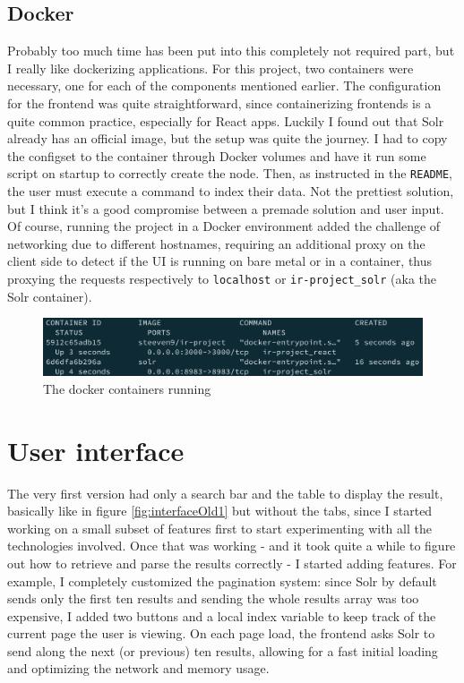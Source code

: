 \documentclass[12pt]{article}
\begin{document}
	\newpage
	
	\subsection{Docker}
	
		Probably too much time has been put into this completely not required part, but I really like dockerizing applications. For this project, two containers were necessary, one for each of the components mentioned earlier. The configuration for the frontend was quite straightforward, since containerizing frontends is a quite common practice, especially for React apps. Luckily I found out that Solr already has an official image, but the setup was quite the journey. I had to copy the configset to the container through Docker volumes and have it run some script on startup to correctly create the node. Then, as instructed in the \texttt{README}, the user must execute a command to index their data. Not the prettiest solution, but I think it's a good compromise between a premade solution and user input. Of course, running the project in a Docker environment added the challenge of networking due to different hostnames, requiring an additional proxy on the client side to detect if the UI is running on bare metal or in a container, thus proxying the requests respectively to \texttt{localhost} or \texttt{ir-project\_solr} (aka the Solr container).
		
		\begin{figure}[H]
			\centering
			\includegraphics[width=\textwidth]{img/docker.png}
			\caption{The docker containers running}
			\label{img:docker}
		\end{figure}
	
	\newpage
	
	
\section{User interface}\label{sec:UI}

	The very first version had only a search bar and the table to display the result, basically like in figure \ref{fig:interfaceOld1} but without the tabs, since I started working on a small subset of features first to start experimenting with all the technologies involved. Once that was working - and it took quite a while to figure out how to retrieve and parse the results correctly - I started adding features. For example, I completely customized the pagination system: since Solr by default sends only the first ten results and sending the whole results array was too expensive, I added two buttons and a local index variable to keep track of the current page the user is viewing. On each page load, the frontend asks Solr to send along the next (or previous) ten results, allowing for a fast initial loading and optimizing the network and memory usage.\\
	
\end{document}
